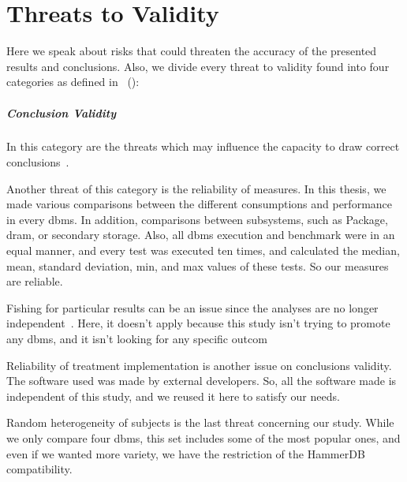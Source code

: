 \chapter{Threats to Validity}
\label{cha:Threats}

Here we speak about risks that could threaten the accuracy of the presented results and conclusions. Also, we divide every threat to validity found into four categories as defined in  \citeauthor{cook1979quasi}~(\citeyear{cook1979quasi}): 

\paragraph{Conclusion Validity}
In this category are the threats which may influence the capacity to draw correct conclusions~\cite{10.5555/2349018}.
    
Another threat of this category is the reliability of measures. In this thesis, we made various comparisons between the different consumptions and performance in every \gls{dbms}. In addition, comparisons between subsystems, such as Package, \gls{dram}, or secondary storage. Also, all \gls{dbms} execution and benchmark were in an equal manner, and every test was executed ten times, and calculated the median, mean, standard deviation, min, and max values of these tests. So our measures are reliable.


Fishing for particular results can be an issue since the analyses are no longer independent~\cite{10.5555/2349018}. Here, it doesn't apply because this study isn't trying to promote any \gls{dbms}, and it isn't looking for any specific outcom


Reliability of treatment implementation is another issue on conclusions validity. The software used was made by external developers. So, all the software made is independent of this study, and we reused it here to satisfy our needs.


Random heterogeneity of subjects is the last threat concerning our study. While we only compare four \gls{dbms}, this set includes some of the most popular ones, and even if we wanted more variety, we have the restriction of the HammerDB compatibility.

